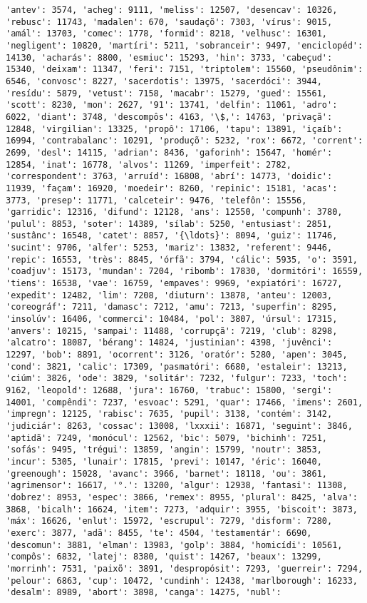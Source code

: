 \documentclass[11pt]{article}
\begin{document}
\begin{Verbatim}[commandchars=\\\{\}]
'antev': 3574, 'acheg': 9111, 'meliss': 12507, 'desencav': 10326, 'rebusc': 11743, 'madalen': 670, 'saudaçõ': 7303, 'vírus': 9015, 'amál': 13703, 'comec': 1778, 'formid': 8218, 'velhusc': 16301, 'negligent': 10820, 'martíri': 5211, 'sobranceir': 9497, 'enciclopéd': 14130, 'acharás': 8800, 'esmiuc': 15293, 'hin': 3733, 'cabeçud': 15340, 'deixam': 11347, 'feri': 7151, 'triptolem': 15560, 'pseudônim': 6546, 'convosc': 8227, 'sacerdotis': 13975, 'sacerdóci': 3944, 'resídu': 5879, 'vetust': 7158, 'macabr': 15279, 'gued': 15561, 'scott': 8230, 'mon': 2627, '91': 13741, 'delfin': 11061, 'adro': 6022, 'diant': 3748, 'descompôs': 4163, '\$,': 14763, 'privaçã': 12848, 'virgilian': 13325, 'propô': 17106, 'tapu': 13891, 'içaíb': 16994, 'contrabalanc': 10291, 'produçõ': 5232, 'rox': 6672, 'corrent': 2699, 'desl': 14115, 'adrian': 8436, 'gaforinh': 15647, 'homér': 12854, 'inat': 16778, 'alvos': 11269, 'imperfeit': 2782, 'correspondent': 3763, 'arruíd': 16808, 'abrí': 14773, 'doidic': 11939, 'façam': 16920, 'moedeir': 8260, 'repinic': 15181, 'acas': 3773, 'presep': 11771, 'calceteir': 9476, 'telefôn': 15556, 'garridic': 12316, 'difund': 12128, 'ans': 12550, 'compunh': 3780, 'pulul': 8853, 'soter': 14389, 'sílab': 5250, 'entusiast': 2851, 'sustânc': 16548, 'catet': 8857, '{\ldots}': 8094, 'guiz': 11746, 'sucint': 9706, 'alfer': 5253, 'mariz': 13832, 'referent': 9446, 'repic': 16553, 'très': 8845, 'órfã': 3794, 'cálic': 5935, 'o': 3591, 'coadjuv': 15173, 'mundan': 7204, 'ribomb': 17830, 'dormitóri': 16559, 'tiens': 16538, 'vae': 16759, 'empaves': 9969, 'expiatóri': 16727, 'expedit': 12482, 'lim': 7208, 'diuturn': 13878, 'anteu': 12003, 'coreográf': 7211, 'damasc': 7212, 'amu': 7213, 'superfin': 8295, 'insolúv': 16406, 'commerci': 10484, 'pol': 3807, 'úrsul': 17315, 'anvers': 10215, 'sampai': 11488, 'corrupçã': 7219, 'club': 8298, 'alcatro': 18087, 'bérang': 14824, 'justinian': 4398, 'juvênci': 12297, 'bob': 8891, 'ocorrent': 3126, 'oratór': 5280, 'apen': 3045, 'cond': 3821, 'calic': 17309, 'pasmatóri': 6680, 'estaleir': 13213, 'ciúm': 3826, 'ode': 3829, 'solitár': 7232, 'fulgur': 7233, 'toch': 9162, 'leopold': 12688, 'jura': 16760, 'trabuc': 15800, 'sergi': 14001, 'compêndi': 7237, 'esvoac': 5291, 'quar': 17466, 'imens': 2601, 'impregn': 12125, 'rabisc': 7635, 'pupil': 3138, 'contém': 3142, 'judiciár': 8263, 'cossac': 13008, 'lxxxii': 16871, 'seguint': 3846, 'aptidã': 7249, 'monócul': 12562, 'bic': 5079, 'bichinh': 7251, 'sofás': 9495, 'trégui': 13859, 'angin': 15799, 'noutr': 3853, 'incur': 5305, 'lunair': 17815, 'previ': 10147, 'éric': 16040, 'greenough': 15028, 'avanc': 3966, 'barnet': 18118, 'ou': 3861, 'agrimensor': 16617, '°.': 13200, 'algur': 12938, 'fantasi': 11308, 'dobrez': 8953, 'espec': 3866, 'remex': 8955, 'plural': 8425, 'alva': 3868, 'bicalh': 16624, 'item': 7273, 'adquir': 3955, 'biscoit': 3873, 'máx': 16626, 'enlut': 15972, 'escrupul': 7279, 'disform': 7280, 'exerc': 3877, 'adã': 8455, 'te': 4504, 'testamentár': 6690, 'descomun': 3881, 'elman': 13983, 'golp': 3884, 'homicídi': 10561, 'compôs': 6832, 'latej': 8380, 'quist': 14267, 'beaux': 13299, 'morrinh': 7531, 'paixõ': 3891, 'despropósit': 7293, 'guerreir': 7294, 'pelour': 6863, 'cup': 10472, 'cundinh': 12438, 'marlborough': 16233, 'desalm': 8989, 'abort': 3898, 'canga': 14275, 'nubl': 
\end{Verbatim}
\end{document}
